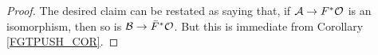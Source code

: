 \documentclass[a4paper,10pt
,draft
]{article}%
\numberwithin{equation}{section}
\numberwithin{figure}{section}
\theoremstyle{definition} %
\newcommand{\1}{\ensuremath{\mathbbm 1}}%
\begin{document}
\begin{proof}
	The desired claim can be restated as saying that,
	if $\mathcal{A} \to F^{\**} \mathcal{O}$
	is an isomorphism,
	then so is $\mathcal{B} \to \bar{F}^{\**} \mathcal{O}$.
	But this is immediate from Corollary \ref{FGTPUSH_COR}.      
\end{proof}









{}

\end{document}
